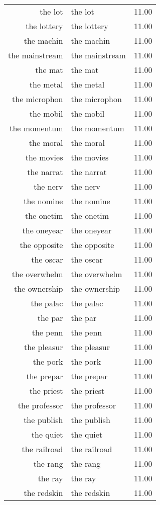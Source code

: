 \begin{table}[ht]
\begin{tabular}{rlr}
  the lot & the lot & 11.00 \\ 
  the lottery & the lottery & 11.00 \\ 
  the machin & the machin & 11.00 \\ 
  the mainstream & the mainstream & 11.00 \\ 
  the mat & the mat & 11.00 \\ 
  the metal & the metal & 11.00 \\ 
  the microphon & the microphon & 11.00 \\ 
  the mobil & the mobil & 11.00 \\ 
  the momentum & the momentum & 11.00 \\ 
  the moral & the moral & 11.00 \\ 
  the movies & the movies & 11.00 \\ 
  the narrat & the narrat & 11.00 \\ 
  the nerv & the nerv & 11.00 \\ 
  the nomine & the nomine & 11.00 \\ 
  the onetim & the onetim & 11.00 \\ 
  the oneyear & the oneyear & 11.00 \\ 
  the opposite & the opposite & 11.00 \\ 
  the oscar & the oscar & 11.00 \\ 
  the overwhelm & the overwhelm & 11.00 \\ 
  the ownership & the ownership & 11.00 \\ 
  the palac & the palac & 11.00 \\ 
  the par & the par & 11.00 \\ 
  the penn & the penn & 11.00 \\ 
  the pleasur & the pleasur & 11.00 \\ 
  the pork & the pork & 11.00 \\ 
  the prepar & the prepar & 11.00 \\ 
  the priest & the priest & 11.00 \\ 
  the professor & the professor & 11.00 \\ 
  the publish & the publish & 11.00 \\ 
  the quiet & the quiet & 11.00 \\ 
  the railroad & the railroad & 11.00 \\ 
  the rang & the rang & 11.00 \\ 
  the ray & the ray & 11.00 \\ 
  the redskin & the redskin & 11.00 \\ 

\end{tabular}
\end{table}
